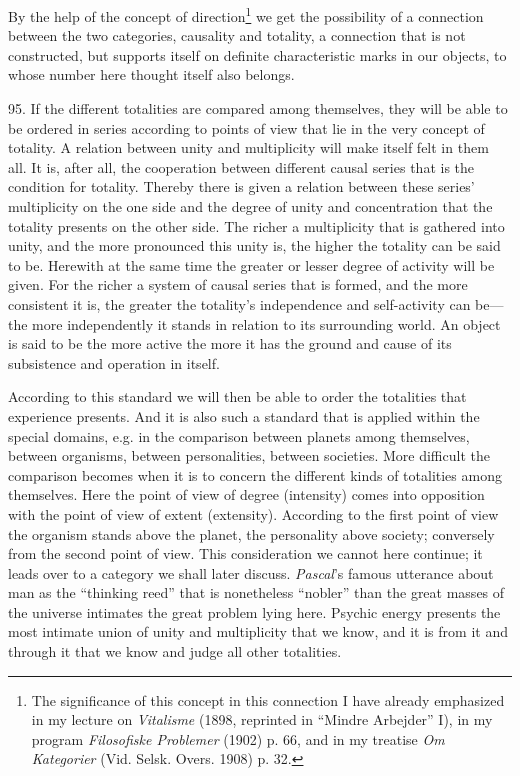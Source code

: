 \documentclass[12pt,a4paper]{book}
\newcommand{\opage}[1]{\marginnote{\footnotesize\textit{[#1]}}}
\begin{document}
By the help of the concept of direction\footnote{The significance of this
concept in this connection I have already emphasized in my lecture on
\emph{Vitalisme} (1898, reprinted in ``Mindre Arbejder'' I), in my program
\emph{Filosofiske Problemer} (1902) p. 66, and in my treatise \emph{Om
Kategorier} (Vid. Selsk. Overs. 1908) p. 32.} we get the possibility of a
connection between the two categories, causality and totality, a connection
that is not constructed, but supports itself on definite characteristic marks
in our objects, to whose number here thought itself also belongs.

95. If the different totalities are compared among themselves, they will be
able to be ordered in series according to points of view that lie in the very
concept of totality. A relation between unity and multiplicity will make
itself felt in them all. It is, after all, the cooperation between different
causal series that is \opage{223}the condition for totality. Thereby there is given a
relation between these series' multiplicity on the one side and the degree of
unity and concentration that the totality presents on the other side. The
richer a multiplicity that is gathered into unity, and the more pronounced
this unity is, the higher the totality can be said to be. Herewith at the same
time the greater or lesser degree of activity will be given. For the richer a
system of causal series that is formed, and the more consistent it is, the
greater the totality's independence and self-activity can be---the more
independently it stands in relation to its surrounding world. An object is
said to be the more active the more it has the ground and cause of its
subsistence and operation in itself.

According to this standard we will then be able to order the totalities that
experience presents. And it is also such a standard that is applied within the
special domains, e.g. in the comparison between planets among themselves,
between organisms, between personalities, between societies. More difficult
the comparison becomes when it is to concern the different kinds of totalities
among themselves. Here the point of view of degree (intensity) comes into
opposition with the point of view of extent (extensity). According to the
first point of view the organism stands above the planet, the personality
above society; conversely from the second point of view. This consideration we
cannot here continue; it leads over to a category we shall later discuss.
\emph{Pascal}'s famous utterance about man as the ``thinking reed'' that is
nonetheless ``nobler'' than the great masses of the universe intimates the
great problem lying here. Psychic energy presents the most intimate union of
unity and multiplicity that we know, and it is from it and through it that we
know and judge all other totalities.
\end{document}
